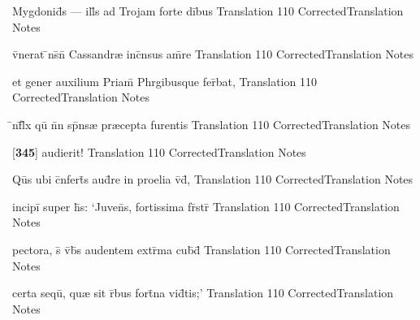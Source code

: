 \latline
  {Mygdonid\={}s --- ill\={\macron {\i}}s ad Trojam forte di\={}bus}
  { Translation }
  {110}
  { CorrectedTranslation }
  { Notes }


\latline
  {v\={}nerat \={\macron {\i}}ns\={}n\={} Cassandr{\ae} inc\={}nsus am\={}re}
  { Translation }
  {110}
  { CorrectedTranslation }
  { Notes }


\latline
  {et gener auxilium Priam\={} Phrgibusque fer\={}bat,}
  { Translation }
  {110}
  { CorrectedTranslation }
  { Notes }


\latline
  {\={\macron {\i}}nf\={}l\={\macron {\i}}x qu\={\macron {\i}} n\={}n sp\={}ns{\ae} pr{\ae}cepta furentis}
  { Translation }
  {110}
  { CorrectedTranslation }
  { Notes }


\latline
  {[\textbf{345}] audierit!}
  { Translation }
  {110}
  { CorrectedTranslation }
  { Notes }


\latline
  {Qu\={}s ubi c\={}nfert\={}s aud\={}re in proelia v\={\macron {\i}}d\={\macron {\i}},}
  { Translation }
  {110}
  { CorrectedTranslation }
  { Notes }


\latline
  {incipi\={} super h\={\macron {\i}}s: `Juven\={}s, fortissima fr\={}str\={}}
  { Translation }
  {110}
  { CorrectedTranslation }
  { Notes }


\latline
  {pectora, s\={\macron {\i}} v\={}b\={\macron {\i}}s audentem extr\={}ma cub\={\macron {\i}}d\={}}
  { Translation }
  {110}
  { CorrectedTranslation }
  { Notes }


\latline
  {certa sequ\={\macron {\i}}, qu{\ae} sit r\={}bus fort\={}na vid\={}tis;'}
  { Translation }
  {110}
  { CorrectedTranslation }
  { Notes }


